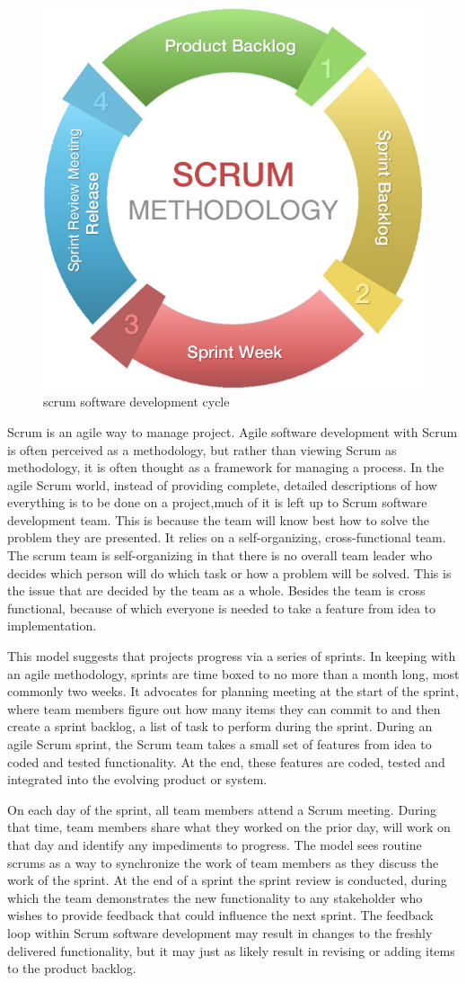 \begin{figure}[!ht]
\centering
\includegraphics[width = 5 cm]{fig/scrum-chart.jpg}
\caption{scrum software development cycle}
\label{fig:scrum}
\end{figure}
Scrum is an agile way to manage project. Agile software development with Scrum is often perceived as a methodology, but rather than viewing Scrum as methodology, it is often thought as a framework for managing a process. In the agile Scrum world, instead of providing complete, detailed descriptions of how everything is to be done on a project,much of it is left up to Scrum software development team. This is because the team will know best how to solve the problem they are presented. It relies on a self-organizing, cross-functional team. The scrum team is self-organizing in that there is no overall team leader who decides which person will do which task or how a problem will be solved. This is the issue that are decided by the team as a whole. Besides the team is cross functional, because of which everyone is needed to take a feature from idea to implementation.

This model suggests that projects progress via a series of sprints. In keeping with an agile methodology, sprints are time boxed to no more than a month long, most commonly two weeks. It advocates for planning meeting at the start of the sprint, where team members figure out how many items they can commit to and then create a sprint backlog, a list of task to perform during the sprint. During an agile Scrum sprint, the Scrum team takes a small set of features from idea to coded and tested functionality. At the end, these features are coded, tested and integrated into the evolving product or system.

On each day of the sprint, all team members attend a Scrum meeting. During that time, team members share what they worked on the prior day, will work on that day and identify any impediments to progress. The model sees routine scrums as a way to synchronize the work of team members as they discuss the work of the sprint. At the end of a sprint the sprint review is conducted, during which the team demonstrates the new functionality to any stakeholder who wishes to provide feedback that could influence the next sprint. The feedback loop within Scrum software development may result in changes to the freshly delivered functionality, but it may just as likely result in revising or adding items to the product backlog.

